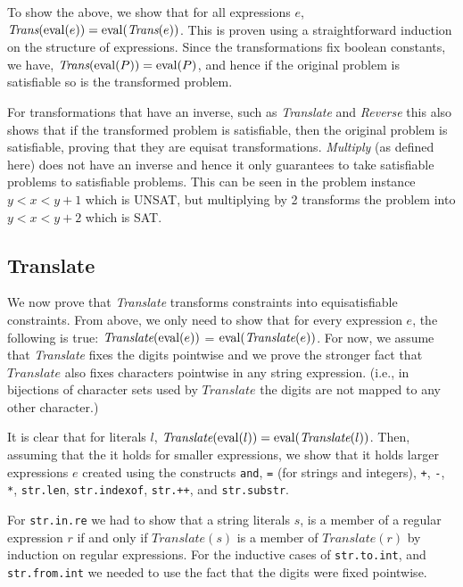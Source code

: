 To show the above, we show that for all expressions $e$,
$\textit{Trans}(\operatorname{eval} (e)) = \operatorname{eval} (\textit{Trans}(e))$. This is
proven using a straightforward induction on the structure of
expressions. Since the transformations fix boolean constants, we have,
$\textit{Trans}(\operatorname{eval} (P)) = \operatorname{eval} (P)$, and hence if the original
problem is satisfiable so is the transformed problem.

For transformations that have an inverse, such as \textit{Translate}
and \textit{Reverse} this also shows that if the transformed problem
is satisfiable, then the original problem is satisfiable, proving that
they are equisat transformations. \textit{Multiply} (as defined here)
does not have an inverse and hence it only guarantees to take
satisfiable problems to satisfiable problems. This can be seen in the
problem instance $y<x<y+1$ which is UNSAT, but multiplying by 2
transforms the problem into $y<x<y+2$ which is SAT.

\subsection{Translate}
We now prove that \textit{Translate} transforms constraints into
equisatisfiable constraints. From above, we only need to show that for
every expression $e$, the following is true: $\textit{Translate}(\operatorname{eval}
(e))$ = $\operatorname{eval} (\textit{Translate}(e))$. For now, we assume that
\textit{Translate} fixes the digits pointwise and we prove the
stronger fact that $\textit{Translate}$ also fixes characters
pointwise in any string expression. (i.e., in bijections of character
sets used by $\textit{Translate}$ the digits are not mapped to any
other character.)

It is clear that for literals $l$, $\textit{Translate}(\operatorname{eval} (l)) =
\operatorname{eval} (\textit{Translate}(l))$. Then, assuming that the it holds for
smaller expressions, we show that it holds larger expressions $e$
created using the constructs \texttt{and}, \texttt{=} (for strings and
integers), \texttt{+}, \texttt{-}, \texttt{*}, \texttt{str.len},
\texttt{str.indexof}, \texttt{str.++}, and \texttt{str.substr}.

For \texttt{str.in.re} we had to show that a string literals $s$, is a
member of a regular expression $r$ if and only if
$\textit{Translate}(s)$ is a member of $\textit{Translate}(r)$ by
induction on regular expressions. For the inductive cases of
\texttt{str.to.int}, and \texttt{str.from.int} we needed to use the
fact that the digits were fixed pointwise.

